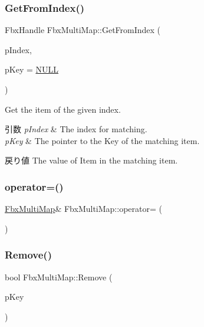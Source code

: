 \subsubsection{\texorpdfstring{Get\+From\+Index()}{GetFromIndex()}}
{\footnotesize\ttfamily Fbx\+Handle Fbx\+Multi\+Map\+::\+Get\+From\+Index (\begin{DoxyParamCaption}\item[{int}]{p\+Index,  }\item[{Fbx\+Handle $\ast$}]{p\+Key = {\ttfamily \hyperlink{fbxarch_8h_a070d2ce7b6bb7e5c05602aa8c308d0c4}{N\+U\+LL}} }\end{DoxyParamCaption})}

Get the item of the given index. 
\begin{DoxyParams}{引数}
{\em p\+Index} & The index for matching. \\
\hline
{\em p\+Key} & The pointer to the Key of the matching item. \\
\hline
\end{DoxyParams}
\begin{DoxyReturn}{戻り値}
The value of Item in the matching item. 
\end{DoxyReturn}
\mbox{\label{class_fbx_multi_map_a0ac91f5605bff211cce31dc46aa97a92}} 
\subsubsection{\texorpdfstring{operator=()}{operator=()}}
{\footnotesize\ttfamily \hyperlink{class_fbx_multi_map}{Fbx\+Multi\+Map}\& Fbx\+Multi\+Map\+::operator= (\begin{DoxyParamCaption}\item[{const \hyperlink{class_fbx_multi_map}{Fbx\+Multi\+Map} \&}]{ }\end{DoxyParamCaption})}

\mbox{\label{class_fbx_multi_map_a373841e60d39a284ea1bc33df94627e7}} 
\subsubsection{\texorpdfstring{Remove()}{Remove()}}
{\footnotesize\ttfamily bool Fbx\+Multi\+Map\+::\+Remove (\begin{DoxyParamCaption}\item[{Fbx\+Handle}]{p\+Key }\end{DoxyParamCaption})}

